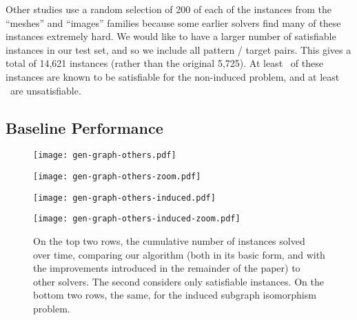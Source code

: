 \documentclass[letterpaper]{article} %
\begin{document}
\noindent
Other studies use a random selection of 200 of each of the instances from the ``meshes'' and
``images'' families because some earlier solvers find many of these instances extremely hard. We
would like to have a larger number of satisfiable instances in our test set, and so we include all
pattern / target pairs. This gives a total of 14,621 instances (rather than the original 5,725). At
least \unskip\ of these instances are known to be satisfiable for the
non-induced problem, and at least \unskip\ are unsatisfiable.

\subsection{Baseline Performance}

\begin{figure}[p]
    \centering
    \texttt{[image: gen-graph-others.pdf]}

    \smallskip

    \centering
    \texttt{[image: gen-graph-others-zoom.pdf]}

    \bigskip

    \centering
    \texttt{[image: gen-graph-others-induced.pdf]}

    \smallskip

    \centering
    \texttt{[image: gen-graph-others-induced-zoom.pdf]}

    \caption{On the top two rows, the cumulative number of instances solved over time, comparing our algorithm
    (both in its basic form, and with the improvements introduced in the remainder of the paper) to
    other solvers. The second considers only satisfiable instances. On the bottom two rows, the same,
    for the induced subgraph isomorphism problem.}
    \label{figure:others}
\end{figure}
\end{document}
